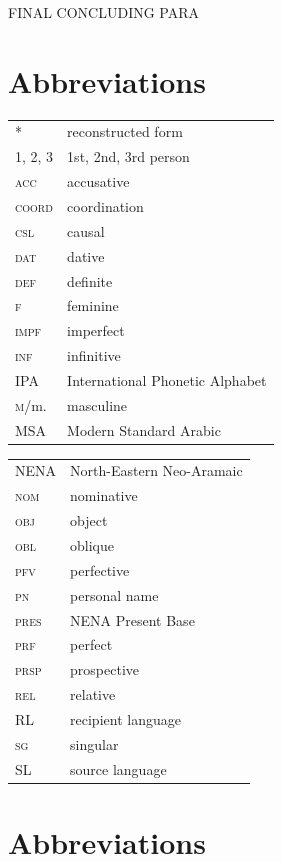 \documentclass[output=paper]{langsci/langscibook}
\begin{document}
FINAL CONCLUDING PARA

\section*{Abbreviations}

\begin{tabularx}{.5\textwidth}[t]{@{}lQ@{}}
*  &  reconstructed form\\
\textsc{1, 2, 3} & 1st, 2nd, 3rd person \\
\textsc{acc} & accusative\\
\textsc{coord} & {coordination}\\
\textsc{csl} & causal \\
\textsc{dat} & dative\\
\textsc{def} & {definite}\\
\textsc{f} & feminine\\
\textsc{impf} & imperfect\\
\textsc{inf} & {infinitive}\\
IPA & International Phonetic Alphabet\\
\textsc{m}/m. & masculine\\
MSA & Modern Standard Arabic
\end{tabularx}%
\begin{tabularx}{.5\textwidth}[t]{@{}lQ@{}}
NENA & North-Eastern Neo-Aramaic\\
\textsc{nom} & nominative\\
\textsc{obj} & object \\
\textsc{obl} & oblique \\
\textsc{pfv} & perfective\\
\textsc{pn} & personal name \\
\textsc{pres}    & NENA Present Base \\
\textsc{prf} & perfect\\
\textsc{prsp} & {prospective}\\
\textsc{rel} & {relative}\\
{RL} & {recipient language}\\
\textsc{sg} & singular\\
{SL} & {source language}\\
\end{tabularx}%

\section*{Abbreviations}
\end{document}
